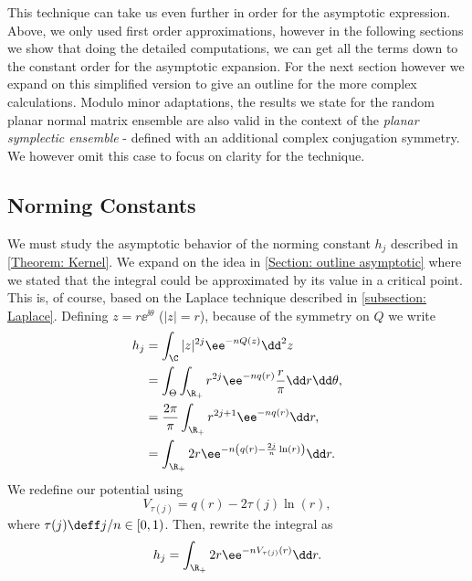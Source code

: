This technique can take us even further in order for the asymptotic expression. Above, we only used first order approximations, however in the following sections we show that doing the detailed computations, we can get all the terms down to the constant order for the asymptotic expansion. For the next section however we expand on this simplified version to give an outline for the more complex calculations. Modulo minor adaptations, the results we state for the random planar normal matrix ensemble are also valid in the context of the \textit{planar symplectic ensemble} - defined with an additional complex conjugation symmetry. We however omit this case to focus on clarity for the technique.



\subsection{Norming Constants}

We must study the asymptotic behavior of the norming constant $h_j$ described in \autoref{Theorem: Kernel}. We expand on the idea in \autoref{Section: outline asymptotic} where we stated that the integral could be approximated by its value in a critical point. This is, of course, based on the Laplace technique described in \autoref{subsection: Laplace}. Defining $z = r \ee^{\ii \theta}$ ($|z| = r$), because of the symmetry on $Q$ we write
\begin{align}
	h_j & = \int_{\C} |z|^{2j} \ee^{-n Q(z)} \dd^2 z \\
	& = \int_{\Theta} \int_{\R_+} r^{2j} \ee^{-n q(r)} \frac{r}{\pi} \dd r \dd \theta, \\
	& = \frac{2 \pi}{\pi} \int_{\R_+} r^{2j+1} \ee^{-n q(r)} \dd r, \\
	& =  \int_{\R_+} 2 r \ee^{-n \left( q(r) - \frac{2j}{n} \ln(r) \right)} \dd r.
\end{align}
We redefine our potential using 
\begin{equation}
	V_{\tau(j)} = q(r) - 2 \tau(j) \ln(r),
\end{equation}
where $\tau(j) \deff j/n \in [0, 1)$. Then, rewrite the integral as
\begin{equation}
	h_j = \int_{\R_+} 2r \ee^{-n V_{\tau(j)}(r)} \dd r.
\end{equation}

